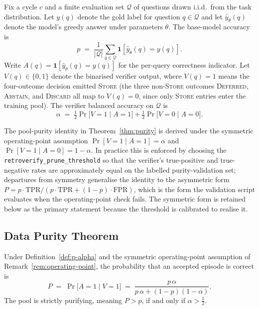 \begin{definition}
\label{def:p-alpha}
Fix a cycle $c$ and a finite evaluation set $\mathcal{Q}$ of questions drawn i.i.d.\ from the task distribution. Let $y(q)$ denote the gold label for question $q \in \mathcal{Q}$ and let $\hat{y}_\theta(q)$ denote the model's greedy answer under parameters $\theta$. The base-model accuracy is
\[
p \;=\; \frac{1}{|\mathcal{Q}|}\sum_{q \in \mathcal{Q}} \mathbf{1}\!\left[\hat{y}_\theta(q) = y(q)\right].
\]
Write $A(q) = \mathbf{1}[\hat{y}_\theta(q) = y(q)]$ for the per-query correctness indicator. Let $V(q) \in \{0, 1\}$ denote the binarised verifier output, where $V(q) = 1$ means the four-outcome decision emitted \textsc{Store} (the three non-\textsc{Store} outcomes \textsc{Deferred}, \textsc{Abstain}, and \textsc{Discard} all map to $V(q) = 0$, since only \textsc{Store} entries enter the training pool). The verifier balanced accuracy on $\mathcal{Q}$ is
\[
\alpha \;=\; \tfrac{1}{2}\Pr\!\big[V=1 \mid A=1\big] + \tfrac{1}{2}\Pr\!\big[V=0 \mid A=0\big].
\]
\end{definition}

\begin{remark}
\label{rem:operating-point}
The pool-purity identity in Theorem~\ref{thm:purity} is derived under the symmetric operating-point assumption $\Pr[V=1 \mid A=1] = \alpha$ and $\Pr[V=1 \mid A=0] = 1 - \alpha$. In practice this is enforced by choosing the \texttt{retroverify\_prune\_threshold} so that the verifier's true-positive and true-negative rates are approximately equal on the labelled purity-validation set; departures from symmetry generalise the identity to the asymmetric form $P = p\cdot\mathrm{TPR} / (p\cdot\mathrm{TPR} + (1-p)\cdot\mathrm{FPR})$, which is the form the validation script evaluates when the operating-point check fails. The symmetric form is retained below as the primary statement because the threshold is calibrated to realise it.
\end{remark}

\subsection{Data Purity Theorem}
\label{sec:purity-theorem}

\begin{theorem}
\label{thm:purity}
Under Definition~\ref{def:p-alpha} and the symmetric operating-point assumption of Remark~\ref{rem:operating-point}, the probability that an accepted episode is correct is
\[
P \;=\; \Pr\!\big[A = 1 \mid V = 1\big] \;=\; \frac{p\,\alpha}{p\,\alpha + (1 - p)(1 - \alpha)}.
\]
The pool is strictly purifying, meaning $P > p$, if and only if $\alpha > \tfrac{1}{2}$.
\end{theorem}

